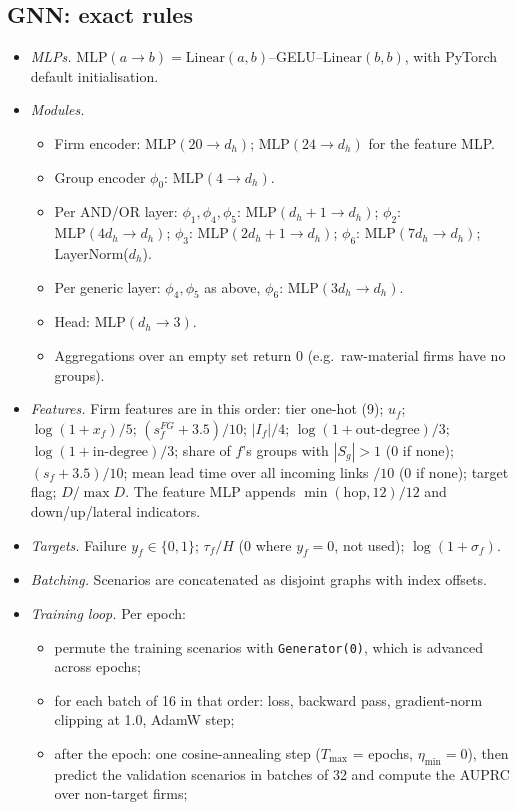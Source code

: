 \documentclass{ifacconf}
\begin{document}
\subsection{GNN: exact rules}
\begin{itemize}
\item \emph{MLPs.} $\mathrm{MLP}(a\to b)=\mathrm{Linear}(a,b)$--GELU--$\mathrm{Linear}(b,b)$, with PyTorch default initialisation.
\item \emph{Modules.}
  \begin{itemize}
  \item Firm encoder: $\mathrm{MLP}(20\to d_h)$; $\mathrm{MLP}(24\to d_h)$ for the feature MLP.
  \item Group encoder $\phi_0$: $\mathrm{MLP}(4\to d_h)$.
  \item Per AND/OR layer: $\phi_1,\phi_4,\phi_5$: $\mathrm{MLP}(d_h{+}1\to d_h)$; $\phi_2$: $\mathrm{MLP}(4d_h\to d_h)$; $\phi_3$: $\mathrm{MLP}(2d_h{+}1\to d_h)$; $\phi_6$: $\mathrm{MLP}(7d_h\to d_h)$; LayerNorm($d_h$).
  \item Per generic layer: $\phi_4,\phi_5$ as above, $\phi_6$: $\mathrm{MLP}(3d_h\to d_h)$.
  \item Head: $\mathrm{MLP}(d_h\to3)$.
  \item Aggregations over an empty set return 0 (e.g.\ raw-material firms have no groups).
  \end{itemize}
\item \emph{Features.} Firm features are in this order: tier one-hot (9); $u_f$; $\log(1+x_f)/5$; $(s^{FG}_f+3.5)/10$; $|I_f|/4$; $\log(1+\text{out-degree})/3$; $\log(1+\text{in-degree})/3$; share of $f$'s groups with $|S_g|>1$ (0 if none); $(s_f+3.5)/10$; mean lead time over all incoming links $/10$ (0 if none); target flag; $D/\max D$. The feature MLP appends $\min(\text{hop},12)/12$ and down/up/lateral indicators.
\item \emph{Targets.} Failure $y_f\in\{0,1\}$; $\tau_f/H$ (0 where $y_f=0$, not used); $\log(1+\sigma_f)$.
\item \emph{Batching.} Scenarios are concatenated as disjoint graphs with index offsets.
\item \emph{Training loop.} Per epoch:
  \begin{itemize}
  \item permute the training scenarios with \texttt{Generator(0)}, which is advanced across epochs;
  \item for each batch of 16 in that order: loss, backward pass, gradient-norm clipping at 1.0, AdamW step;
  \item after the epoch: one cosine-annealing step ($T_{\max}$ = epochs, $\eta_{\min}=0$), then predict the validation scenarios in batches of 32 and compute the AUPRC over non-target firms;

\end{itemize}
\end{itemize}
\end{document}
